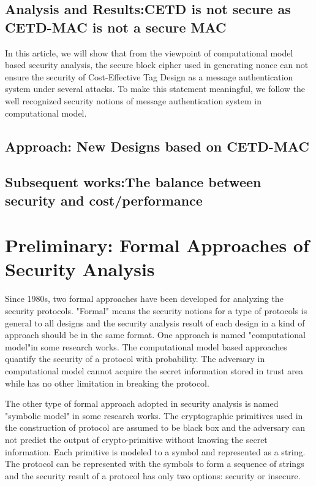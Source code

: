 \documentclass{article}
\begin{document}
\subsection{Analysis and Results:CETD is not secure as CETD-MAC is not a secure MAC}
In this article, we will show that from the viewpoint of computational model based security analysis, the secure block cipher used in generating nonce can not ensure the security of Cost-Effective Tag Design as a message authentication system under several attacks. To make this statement meaningful, we follow the well recognized security notions of message authentication system in computational model.
\subsection{Approach: New Designs based on CETD-MAC}
\subsection{Subsequent works:The balance between security and cost/performance}

\section{Preliminary: Formal Approaches of Security Analysis}
Since 1980s, two formal approaches have been developed for analyzing the
security protocols. "Formal" means the security notions for a type of protocols
is general to all designs and the security analysis result of each design in a
kind of approach should be in the same format. One approach is named
"computational model"in some research works. The computational model based
approaches quantify the security of a protocol with probability. The adversary
in computational model cannot acquire the secret information stored in trust
area while has no other limitation in breaking the protocol. 

The other type of formal approach adopted in security analysis is named
"symbolic model" in some research works. The cryptographic primitives used in
the construction of protocol are assumed to be black box and the adversary can
not predict the output of crypto-primitive without knowing the secret
information. Each primitive is modeled to a symbol and represented as a string.
The protocol can be represented with the symbols to form a sequence of strings
and the security result of a protocol has only two options: security or insecure.  
\end{document}
